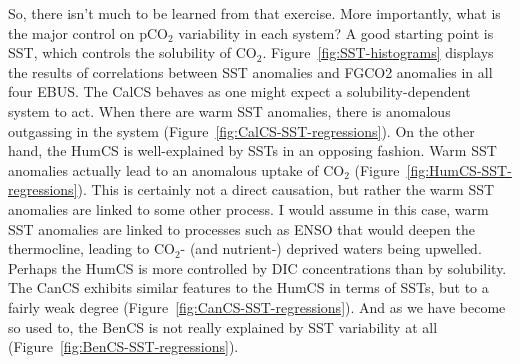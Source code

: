 \documentclass[12pt]{article}
\begin{document}
So, there isn't much to be learned from that exercise. More importantly, what is the major control on pCO$_{2}$ variability in each system? A good starting point is SST, which controls the solubility of CO$_{2}$. Figure~\ref{fig:SST-histograms} displays the results of correlations between SST anomalies and FGCO2 anomalies in all four EBUS. The CalCS behaves as one might expect a solubility-dependent system to act. When there are warm SST anomalies, there is anomalous outgassing in the system (Figure~\ref{fig:CalCS-SST-regressions}). On the other hand, the HumCS is well-explained by SSTs in an opposing fashion. Warm SST anomalies actually lead to an anomalous uptake of CO$_{2}$ (Figure~\ref{fig:HumCS-SST-regressions}). This is certainly not a direct causation, but rather the warm SST anomalies are linked to some other process. I would assume in this case, warm SST anomalies are linked to processes such as ENSO that would deepen the thermocline, leading to CO$_{2}$- (and nutrient-) deprived waters being upwelled. Perhaps the HumCS is more controlled by DIC concentrations than by solubility. \\

The CanCS exhibits similar features to the HumCS in terms of SSTs, but to a fairly weak degree (Figure~\ref{fig:CanCS-SST-regressions}). And as we have become so used to, the BenCS is not really explained by SST variability at all (Figure~\ref{fig:BenCS-SST-regressions}).
\end{document}
